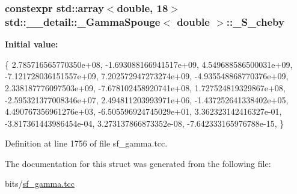 \subsubsection[{\texorpdfstring{\+\_\+\+S\+\_\+cheby}{_S_cheby}}]{\setlength{\rightskip}{0pt plus 5cm}constexpr std\+::array$<$double, 18$>$ {\bf std\+::\+\_\+\+\_\+detail\+::\+\_\+\+Gamma\+Spouge}$<$ double $>$\+::\+\_\+\+S\+\_\+cheby\hspace{0.3cm}{\ttfamily [static]}}\hypertarget{structstd_1_1____detail_1_1__GammaSpouge_3_01double_01_4_a84c53acfde99ff09d70537e3b4a1c883}{}\label{structstd_1_1____detail_1_1__GammaSpouge_3_01double_01_4_a84c53acfde99ff09d70537e3b4a1c883}
{\bfseries Initial value\+:}
\begin{DoxyCode}
\{
    2.785716565770350e+08,
    -1.693088166941517e+09,
    4.549688586500031e+09,
    -7.121728036151557e+09,
    7.202572947273274e+09,
    -4.935548868770376e+09,
    2.338187776097503e+09,
    -7.678102458920741e+08,
    1.727524819329867e+08,
    -2.595321377008346e+07,
    2.494811203993971e+06,
    -1.437252641338402e+05,
    4.490767356961276e+03,
    -6.505596924745029e+01,
    3.362323142416327e-01,
    -3.817361443986454e-04,
    3.273137866873352e-08,
    -7.642333165976788e-15,
      \}
\end{DoxyCode}


Definition at line 1756 of file sf\+\_\+gamma.\+tcc.



The documentation for this struct was generated from the following file\+:\begin{DoxyCompactItemize}
\item 
bits/\hyperlink{sf__gamma_8tcc}{sf\+\_\+gamma.\+tcc}\end{DoxyCompactItemize}
